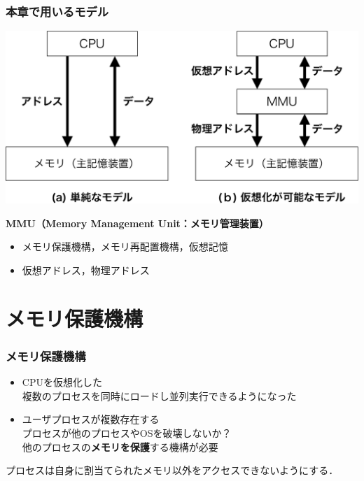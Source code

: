 \documentclass{beamer}                   %
\begin{document}
\begin{frame}
  \frametitle{本章で用いるモデル}
  \begin{center}
    \includegraphics[scale=0.40]{Fig/cpuAndMemory-crop.pdf}\\
  \end{center}
      {\bf MMU（Memory Management Unit：メモリ管理装置）}
      \begin{itemize}
      \item メモリ保護機構，メモリ再配置機構，仮想記憶
      \item 仮想アドレス，物理アドレス
      \end{itemize}
\end{frame}

\section{メモリ保護機構}
\begin{frame}
  \frametitle{メモリ保護機構}
  \begin{itemize}
    \item CPUを仮想化した\\
      複数のプロセスを同時にロードし並列実行できるようになった
    \item ユーザプロセスが複数存在する \\
      プロセスが他のプロセスやOSを破壊しないか？\\
      他のプロセスの{\bf メモリを保護}する機構が必要
  \end{itemize}
  プロセスは自身に割当てられたメモリ以外をアクセスできないようにする．
\end{frame}
\end{document}
